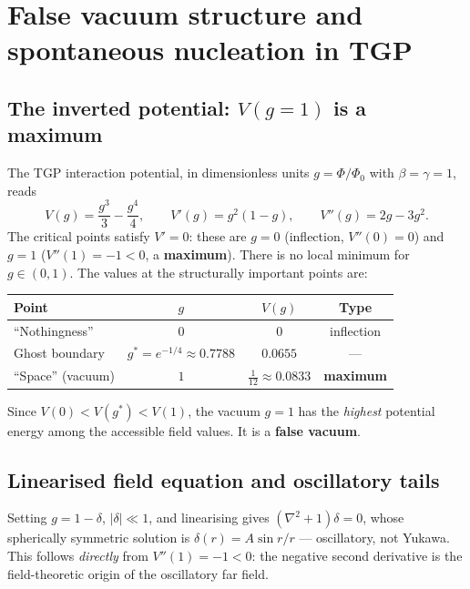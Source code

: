 
\section{False vacuum structure and spontaneous nucleation in TGP}
\label{sec:false_vacuum}

\subsection{The inverted potential: $V(g=1)$ is a maximum}

The TGP interaction potential, in dimensionless units $g=\Phi/\Phi_0$
with $\beta=\gamma=1$, reads
\begin{equation}
  V(g) = \frac{g^3}{3} - \frac{g^4}{4},
  \qquad
  V'(g) = g^2(1-g),
  \qquad
  V''(g) = 2g - 3g^2.
\end{equation}
The critical points satisfy $V'=0$: these are $g=0$ (inflection,
$V''(0)=0$) and $g=1$ ($V''(1)=-1<0$, a \textbf{maximum}).  There is
no local minimum for $g\in(0,1)$.  The values at the
structurally important points are:

\begin{center}
\begin{tabular}{lccc}
\hline
Point & $g$ & $V(g)$ & Type \\
\hline
``Nothingness'' & $0$ & $0$ & inflection \\
Ghost boundary & $g^*=e^{-1/4}\approx0.7788$ & $0.0655$ & --- \\
``Space'' (vacuum) & $1$ & $\tfrac{1}{12}\approx0.0833$ & \textbf{maximum} \\
\hline
\end{tabular}
\end{center}

\noindent
Since $V(0)<V(g^*)<V(1)$, the vacuum $g=1$ has the \emph{highest}
potential energy among the accessible field values.  It is a
\textbf{false vacuum}.

\subsection{Linearised field equation and oscillatory tails}

Setting $g=1-\delta$, $|\delta|\ll1$, and linearising gives
$(\nabla^2+1)\delta=0$, whose spherically symmetric solution is
$\delta(r)=A\sin r/r$ — oscillatory, not Yukawa.  This follows
\emph{directly} from $V''(1)=-1<0$: the negative second derivative
is the field-theoretic origin of the oscillatory far field.

